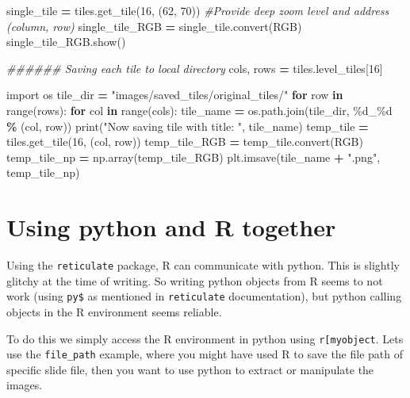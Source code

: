 \documentclass[
]{book}
\newenvironment{Shaded}{\begin{snugshade}}{\end{snugshade}}
\newcommand{\BuiltInTok}[1]{#1}
\newcommand{\CommentTok}[1]{\textcolor[rgb]{0.56,0.35,0.01}{\textit{#1}}}
\newcommand{\ControlFlowTok}[1]{\textcolor[rgb]{0.13,0.29,0.53}{\textbf{#1}}}
\newcommand{\DecValTok}[1]{\textcolor[rgb]{0.00,0.00,0.81}{#1}}
\newcommand{\ImportTok}[1]{#1}
\newcommand{\KeywordTok}[1]{\textcolor[rgb]{0.13,0.29,0.53}{\textbf{#1}}}
\newcommand{\NormalTok}[1]{#1}
\newcommand{\OperatorTok}[1]{\textcolor[rgb]{0.81,0.36,0.00}{\textbf{#1}}}
\newcommand{\SpecialCharTok}[1]{\textcolor[rgb]{0.00,0.00,0.00}{#1}}
\newcommand{\StringTok}[1]{\textcolor[rgb]{0.31,0.60,0.02}{#1}}
\begin{document}
\begin{Shaded}
\begin{Highlighting}[]
\NormalTok{single\_tile }\OperatorTok{=}\NormalTok{ tiles.get\_tile(}\DecValTok{16}\NormalTok{, (}\DecValTok{62}\NormalTok{, }\DecValTok{70}\NormalTok{)) }\CommentTok{\#Provide deep zoom level and address (column, row)}
\NormalTok{single\_tile\_RGB }\OperatorTok{=}\NormalTok{ single\_tile.convert(}\StringTok{\textquotesingle{}RGB\textquotesingle{}}\NormalTok{)}
\NormalTok{single\_tile\_RGB.show()}

\CommentTok{\#\#\#\#\#\# Saving each tile to local directory}
\NormalTok{cols, rows }\OperatorTok{=}\NormalTok{ tiles.level\_tiles[}\DecValTok{16}\NormalTok{]}

\ImportTok{import}\NormalTok{ os}
\NormalTok{tile\_dir }\OperatorTok{=} \StringTok{"images/saved\_tiles/original\_tiles/"}
\ControlFlowTok{for}\NormalTok{ row }\KeywordTok{in} \BuiltInTok{range}\NormalTok{(rows):}
    \ControlFlowTok{for}\NormalTok{ col }\KeywordTok{in} \BuiltInTok{range}\NormalTok{(cols):}
\NormalTok{        tile\_name }\OperatorTok{=}\NormalTok{ os.path.join(tile\_dir, }\StringTok{\textquotesingle{}}\SpecialCharTok{\%d}\StringTok{\_}\SpecialCharTok{\%d}\StringTok{\textquotesingle{}} \OperatorTok{\%}\NormalTok{ (col, row))}
        \BuiltInTok{print}\NormalTok{(}\StringTok{"Now saving tile with title: "}\NormalTok{, tile\_name)}
\NormalTok{        temp\_tile }\OperatorTok{=}\NormalTok{ tiles.get\_tile(}\DecValTok{16}\NormalTok{, (col, row))}
\NormalTok{        temp\_tile\_RGB }\OperatorTok{=}\NormalTok{ temp\_tile.convert(}\StringTok{\textquotesingle{}RGB\textquotesingle{}}\NormalTok{)}
\NormalTok{        temp\_tile\_np }\OperatorTok{=}\NormalTok{ np.array(temp\_tile\_RGB)}
\NormalTok{        plt.imsave(tile\_name }\OperatorTok{+} \StringTok{".png"}\NormalTok{, temp\_tile\_np)}
\end{Highlighting}
\end{Shaded}

\hypertarget{using-python-and-r-together}{%
\section{Using python and R together}\label{using-python-and-r-together}}

Using the \texttt{reticulate} package, R can communicate with python. This is slightly glitchy at the time of writing. So writing python objects from R seems to not work (using \texttt{py\$} as mentioned in \texttt{reticulate} documentation), but python calling objects in the R environment seems reliable.

To do this we simply access the R environment in python using \texttt{r{[}\textquotesingle{}myobject\textquotesingle{}{]}}. Lets use the \texttt{file\_path} example, where you might have used R to save the file path of specific slide file, then you want to use python to extract or manipulate the images.
\end{document}
